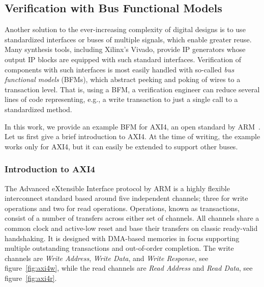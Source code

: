 \documentclass[runningheads]{llncs}
\begin{document}
\subsection{Verification with Bus Functional Models}
Another solution to the ever-increasing complexity of digital designs is to use standardized interfaces or buses of multiple signals, which enable greater reuse. 
Many synthesis tools, including Xilinx's Vivado, provide IP generators whose output IP blocks are equipped with such standard interfaces. Verification of components 
with such interfaces is most easily handled with so-called \textit{bus functional models} (BFMs), which abstract peeking and poking of wires to a transaction level. That is, 
using a BFM, a verification engineer can reduce several lines of code representing, e.g., a write transaction to just a single call to a standardized method.

In this work, we provide an example BFM for AXI4, an open standard by ARM~\cite{axi4standard}. Let us first give a brief introduction to AXI4. At the time of writing, the example works only for AXI4, but it can easily be extended to support other buses.

\subsubsection{Introduction to AXI4}
The Advanced eXtensible Interface protocol by ARM is a highly flexible interconnect standard based around five independent channels; three for write operations and two for read operations. Operations, known as transactions, consist of a number of transfers across either set of channels. All channels share a common clock and active-low reset and base their transfers on classic ready-valid handshaking. It is designed with DMA-based memories in focus supporting multiple outstanding transactions and out-of-order completion. The write channels are \textit{Write Address}, \textit{Write Data}, and \textit{Write Response}, see figure~\ref{fig:axi4w}, while the read channels are \textit{Read Address} and \textit{Read Data}, see figure~\ref{fig:axi4r}. 
\end{document}
